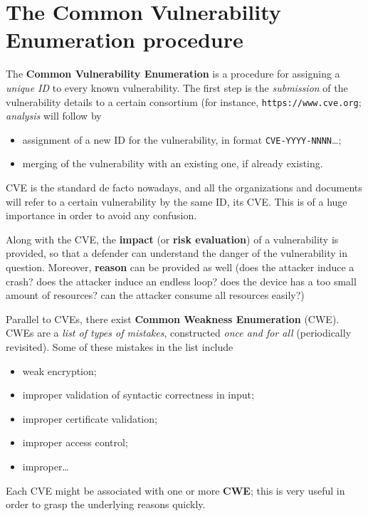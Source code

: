 \documentclass[10pt]{extbook}
\begin{document}
\section{The Common Vulnerability Enumeration procedure}

The \textbf{Common Vulnerability Enumeration} is a procedure for assigning a
\emph{unique ID} to every known vulnerability. The first step is the
\emph{submission} of the vulnerability details to a certain consortium (for
instance, \texttt{https://\-www\-.cve.org}; \emph{analysis} will follow by
\begin{itemize}
    \item assignment of a new ID for the vulnerability, in format
        \texttt{CVE-YYYY-NNNN}\dots;
    \item merging of the vulnerability with an existing one, if already
        existing.
\end{itemize}

CVE is the standard de facto nowadays, and all the organizations and documents
will refer to a certain vulnerability by the same ID, its CVE. This is of a
huge importance in order to avoid any confusion.

Along with the CVE, the \textbf{impact} (or \textbf{risk evaluation}) of a
vulnerability is provided, so that a defender can understand the danger of the
vulnerability in question. Moreover, \textbf{reason} can be provided as well
(does the attacker induce a crash? does the attacker induce an endless loop?
does the device has a too small amount of resources? can the attacker consume
all resources easily?)

Parallel to CVEs, there exist \textbf{Common Weakness Enumeration} (CWE). CWEs
are a \emph{list of types of mistakes}, constructed \emph{once and for all}
(periodically revisited). Some of these mistakes in the list include
\begin{itemize}
    \item weak encryption;
    \item improper validation of syntactic correctness in input;
    \item improper certificate validation;
    \item improper access control;
    \item improper\dots
\end{itemize}

Each CVE might be associated with one or more \textbf{CWE}; this is very useful
in order to grasp the underlying reasons quickly.
\end{document}
